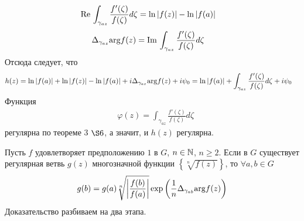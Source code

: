 \begin{itemize}
    \begin{align*}
      & \mathrm{Re}\, \int_{\gamma_{az}}\frac{f'(\zeta)}{f(\zeta)}d\zeta = \ln \left| f(z) \right| - \ln \left| f(a) \right|
    \end{align*}
    \begin{align*}
      & \Delta_{\gamma_{az}}\mathrm{arg} f(z) = \mathrm{Im}\, \int_{\gamma_{az}}\frac{f'(\zeta)}{f(\zeta)}d\zeta
    \end{align*}
    Отсюда следует, что
    \begin{align*}
      & h(z) = \ln \left| f(a) \right| + \ln \left| f(z) \right| - \ln \left| f(a) \right| + i \Delta_{\gamma_{az}} \mathrm{arg} f(z) + i \psi_0 = \ln \left| f(a) \right| + \int_{\gamma_{az}}\frac{f'(\zeta)}{f(\zeta)}d \zeta +  i \psi_0 
    \end{align*}
    Функция
    \begin{align*}
      & \varphi(z) = \int_{\gamma_{az}}\frac{f'(\zeta)}{f(\zeta)}d\zeta
    \end{align*}
    регулярна по теореме $3$ $\S 6$, а значит, и $h(z)$ регулярна.
\end{itemize}
\lemma
Пусть $f$ удовлетворяет предположению $1$ в $G$, $n \in \mathbb{N}$, $n \geq 2$. Если в
$G$ существует регулярная ветвь $g(z)$ многозначной функции $\left\{
    \sqrt[n]{f(z)} \right\}$, то $\forall a, b \in G$
\begin{equation}\label{(16.14)}
    g(b) = g(a) \sqrt[n]{\left| \frac{f(b)}{f(a)} \right|}\exp \left( \frac{1}{n}\Delta_{\gamma_{ab}}\mathrm{arg} f(z) \right)
\end{equation}
\pr Доказательство разбиваем на два этапа.
